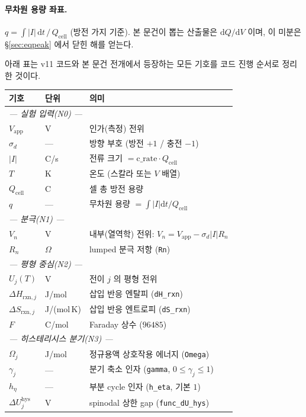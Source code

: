 \documentclass[11pt,a4paper]{article}
\newcommand{\dd}{\mathrm{d}}
\newcommand{\app}{\mathrm{app}}
\newcommand{\cell}{\mathrm{cell}}
\newcommand{\hys}{\mathrm{hys}}
\begin{document}
\paragraph{무차원 용량 좌표.}
$q = \int|I|\,\dd t\,/\,Q_\cell$ (방전 가지 기준). 본 문건이 뽑는 산출물은
$\dd Q/\dd V$ 이며, 이 미분은 \S\ref{sec:eqpeak} 에서 닫힌 해를 얻는다.

아래 표는 v11 코드와 본 문건 전개에서 등장하는 모든 기호를 코드 진행 순서로
정리한 것이다.

\begin{longtable}{p{} p{} p{}}
\toprule 기호 & 단위 & 의미 \\ \midrule \endhead
\multicolumn{3}{l}{\emph{--- 실험 입력(N0) ---}}\\
$V_\app$ & V & 인가(측정) 전위\\
$\sigma_d$ & --- & 방향 부호 (방전 $+1$ / 충전 $-1$)\\
$|I|$ & C/s & 전류 크기 $=\text{c\_rate}\cdot Q_\cell$\\
$T$ & K & 온도 (스칼라 또는 $V$ 배열)\\
$Q_\cell$ & C & 셀 총 방전 용량\\
$q$ & --- & 무차원 용량 $=\int|I|\dd t/Q_\cell$\\
\multicolumn{3}{l}{\emph{--- 분극(N1) ---}}\\
$V_n$ & V & 내부(열역학) 전위: $V_n = V_\app - \sigma_d|I|R_n$\\
$R_n$ & $\Omega$ & lumped 분극 저항 (\texttt{Rn})\\
\multicolumn{3}{l}{\emph{--- 평형 중심(N2) ---}}\\
$U_j(T)$ & V & 전이 $j$ 의 평형 전위\\
$\Delta H_{\mathrm{rxn},j}$ & J/mol & 삽입 반응 엔탈피 (\texttt{dH\_rxn})\\
$\Delta S_{\mathrm{rxn},j}$ & J/(mol\,K) & 삽입 반응 엔트로피 (\texttt{dS\_rxn})\\
$F$ & C/mol & Faraday 상수 ($96485$)\\
\multicolumn{3}{l}{\emph{--- 히스테리시스 분기(N3) ---}}\\
$\Omega_j$ & J/mol & 정규용액 상호작용 에너지 (\texttt{Omega})\\
$\gamma_j$ & --- & 분기 축소 인자 (\texttt{gamma}, $0\le\gamma_j\le1$)\\
$h_\eta$ & --- & 부분 cycle 인자 (\texttt{h\_eta}, 기본 $1$)\\
$\Delta U_j^\hys$ & V & spinodal 상한 gap (\texttt{func\_dU\_hys})\\

\end{longtable}
\end{document}
